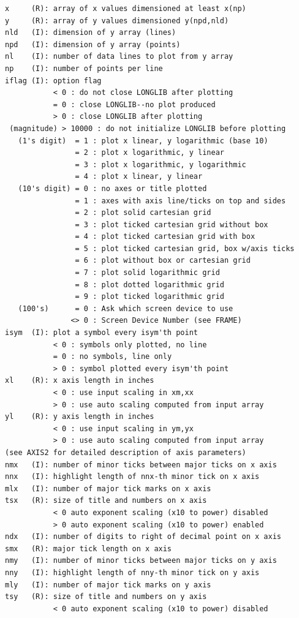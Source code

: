 \documentclass[11pt]{report}
\begin{document}
\begin{verbatim}
x     (R): array of x values dimensioned at least x(np)
y     (R): array of y values dimensioned y(npd,nld)
nld   (I): dimension of y array (lines)
npd   (I): dimension of y array (points)
nl    (I): number of data lines to plot from y array
np    (I): number of points per line
iflag (I): option flag
           < 0 : do not close LONGLIB after plotting
           = 0 : close LONGLIB--no plot produced
           > 0 : close LONGLIB after plotting
 (magnitude) > 10000 : do not initialize LONGLIB before plotting
   (1's digit)  = 1 : plot x linear, y logarithmic (base 10)
                = 2 : plot x logarithmic, y linear
                = 3 : plot x logarithmic, y logarithmic
                = 4 : plot x linear, y linear
   (10's digit) = 0 : no axes or title plotted
                = 1 : axes with axis line/ticks on top and sides
                = 2 : plot solid cartesian grid
                = 3 : plot ticked cartesian grid without box
                = 4 : plot ticked cartesian grid with box
                = 5 : plot ticked cartesian grid, box w/axis ticks
                = 6 : plot without box or cartesian grid
                = 7 : plot solid logarithmic grid
                = 8 : plot dotted logarithmic grid
                = 9 : plot ticked logarithmic grid
   (100's)      = 0 : Ask which screen device to use
               <> 0 : Screen Device Number (see FRAME)
isym  (I): plot a symbol every isym'th point
           < 0 : symbols only plotted, no line
           = 0 : no symbols, line only
           > 0 : symbol plotted every isym'th point
xl    (R): x axis length in inches
           < 0 : use input scaling in xm,xx
           > 0 : use auto scaling computed from input array
yl    (R): y axis length in inches
           < 0 : use input scaling in ym,yx
           > 0 : use auto scaling computed from input array
(see AXIS2 for detailed description of axis parameters)
nmx   (I): number of minor ticks between major ticks on x axis
nnx   (I): highlight length of nnx-th minor tick on x axis
mlx   (I): number of major tick marks on x axis
tsx   (R): size of title and numbers on x axis
           < 0 auto exponent scaling (x10 to power) disabled
           > 0 auto exponent scaling (x10 to power) enabled
ndx   (I): number of digits to right of decimal point on x axis
smx   (R): major tick length on x axis
nmy   (I): number of minor ticks between major ticks on y axis
nny   (I): highlight length of nny-th minor tick on y axis
mly   (I): number of major tick marks on y axis
tsy   (R): size of title and numbers on y axis
           < 0 auto exponent scaling (x10 to power) disabled

\end{verbatim}
\end{document}
